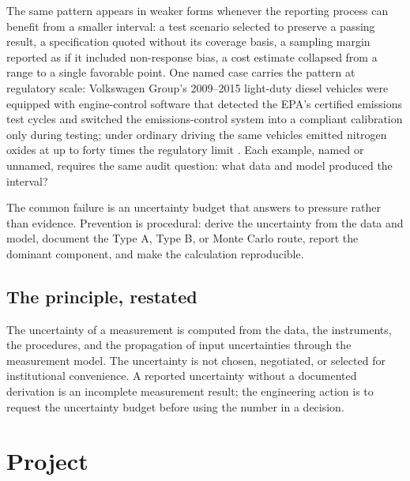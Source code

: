 The same pattern appears in weaker forms whenever the reporting
process can benefit from a smaller interval: a test scenario
selected to preserve a passing result, a specification quoted
without its coverage basis, a sampling margin reported as if it
included non-response bias, a cost estimate collapsed from a range
to a single favorable point. One named case carries the pattern at
regulatory scale: Volkswagen Group's 2009--2015 light-duty diesel
vehicles were equipped with engine-control software that detected
the EPA's certified emissions test cycles and switched the
emissions-control system into a compliant calibration only during
testing; under ordinary driving the same vehicles emitted nitrogen
oxides at up to forty times the regulatory limit
\cite{acc:epa-vw-nov-2015, acc:doj-vw-2017}. Each example, named or
unnamed, requires the same audit question: what data and model
produced the interval?

The common failure is an uncertainty budget that answers to pressure
rather than evidence. Prevention is procedural: derive the
uncertainty from the data and model, document the Type A, Type B,
or Monte Carlo route, report the dominant component, and make the
calculation reproducible.

\subsection{The principle, restated}

\begin{principle}
The uncertainty of a measurement is computed from the data, the
instruments, the procedures, and the propagation of input
uncertainties through the measurement model. The uncertainty is
not chosen, negotiated, or selected for institutional convenience.
A reported uncertainty without a documented derivation is an
incomplete measurement result; the engineering action is to request
the uncertainty budget before using the number in a decision.
\end{principle}

\section{Project}

